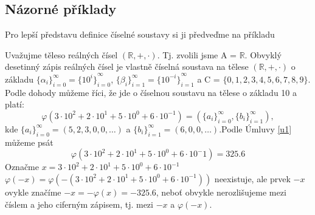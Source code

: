 \documentclass[czech,bachelor,dept470,male]{diploma}
\newcommand{\poslbeta}{\{\beta_i\}_{i=1}^{\infty}}
\newcommand{\poslalpha}{\{\alpha_i\}_{i=0}^{\infty}}
\newcommand{\posla}{\{a_i\}_{i=0}^{\infty}}
\newcommand{\poslb}{\{b_i\}_{i=1}^{\infty}}
\begin{document}
\subsection{Názorné příklady}
Pro lepší představu definice číselné soustavy si ji předveďme na příkladu
\begin{example}
	Uvažujme těleso reálných čísel $(\mathbb{R},+,\cdot)$. Tj. zvolili jsme A = $\mathbb{R}$. Obvyklý desetinný zápis reálných čísel je vlastně číselná soustava na tělese $(\mathbb{R},+,\cdot)$ o základu $\poslalpha=\{{10^i\}}_{i=0}^{\infty}$, $\poslbeta=\{{10^{-i}\}}_{i=1}^{\infty}$ a C = $\{0,1,2,3,4,5,6,7,8,9\}$. Podle dohody můžeme říci, že jde o číselnou soustavu na tělese o základu 10 a platí:
	$$\varphi(3\cdot10^2+2\cdot10^1+5\cdot10^0+6\cdot10^{-1})=(\posla,\poslb),$$kde
	$\posla=(5,2,3,0,0,\dots)$ a $\poslb = (6,0,0,\dots)$.\newline Podle Úmluvy \ref{u1} můžeme psát $$\varphi(3\cdot10^2+2\cdot10^1+5\cdot10^0+6\cdot10^-1)=325.6$$
	Označme $x=3\cdot10^2+2\cdot10^1+5\cdot10^0+6\cdot10^{-1}$\newline
	$\varphi(-x) = \varphi(-(3\cdot10^2+2\cdot10^1+5\cdot10^0+6\cdot10^{-1}))$ neexistuje, ale prvek $-x$ ovykle značíme $-x=-\varphi(x)=-325.6$, neboť obvykle nerozlišujeme mezi číslem a jeho ciferným zápisem, tj. mezi $-x$ a $\varphi(-x)$.
	
	
\end{example}
\end{document}
